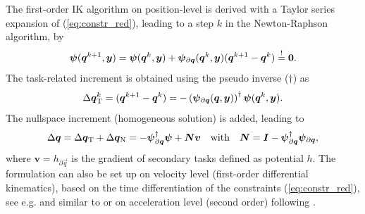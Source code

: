 \documentclass[
	graybox,
	vecphys] %
	{svmult}
\newcommand{\bm}[1]{\boldsymbol{#1}}
\newcommand{\vecResR}[0]{\vec{\psi}}
\begin{document}
The first-order IK algorithm on position-level is derived with a Taylor series expansion of (\ref{eq:constr_red}), leading to a step $k$ in the Newton-Raphson algorithm, by
%
\vspace{-0.2cm}
\begin{equation}
\vecResR(\vec{q}^{k+1},\vec{y}) =
\vecResR(\vec{q}^{k},\vec{y})
+
\vecResR_{\partial \vec{q}}(\vec{q}^k,\vec{y}) (\vec{q}^{k+1} - \vec{q}^k)
\overset{!}{=}
\vec{0}.
\vspace{-0.2cm}
\end{equation}
%
The task-related increment is obtained using the pseudo inverse ($\dagger$) as 
%
\vspace{-0.2cm}
\begin{equation}
\Delta \vec{q}^k_{\mathrm{T}}
=
(\vec{q}^{k+1} - \vec{q}^k)
=
- 
\left(\vecResR_{\partial \vec{q}}(\vec{q},\vec{y})\right)^{\dagger}
\vecResR(\vec{q}^{k},\vec{y}).
\label{equ:deltaq_psi}
\vspace{-0.2cm}
\end{equation}
%
The nullspace increment (homogeneous solution) is added, leading to
%
\vspace{-0.2cm}
\begin{equation}
{\Delta}\vec{q}
=
{\Delta}\vec{q}_{\mathrm{T}} + {\Delta}\vec{q}_{\mathrm{N}}
=
-\vecResR_{\partial\vec{q}}^{\dagger} \vecResR +  \vec{N} \bm{v}
\quad \mathrm{with} \quad
\vec{N}=\vec{I}-\vecResR_{\partial\vec{q}}^{\dagger}\vecResR_{\partial\vec{q}},
\label{equ:nullspace}
\vspace{-0.2cm}
\end{equation}
where $\bm{v}{=}h_{\partial\vec{q}}$ is the gradient of secondary tasks defined as potential $h$.
%
The formulation can also be set up on velocity level (first-order differential kinematics), based on the time differentiation of the constraints (\ref{eq:constr_red}), see e.g. \cite{Merlet2006} and similar to \cite{Gogu2008,SantosSil2017,AgarwalNasBan2016} or on acceleration level (second order) following \cite{ReiterMueGat2018,SchapplerOrt2021}.
\vspace{-0.4cm}
\end{document}
